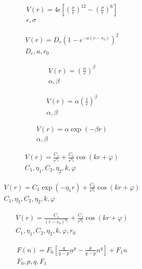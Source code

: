 \documentclass[a4paper,10pt]{article}
\begin{document}
\begin{eqnarray*}
V(r)=4\epsilon\left[\left(\frac{\sigma}{r}\right)^{12}-\left(\frac{\sigma}{r}\right)^{6}\right]\\
\epsilon,\sigma
\end{eqnarray*}

\begin{eqnarray*}
V(r)=D_e ( 1-e^{-a(r-r_0)} )^2 \\
D_e,a,r_0
\end{eqnarray*}

\begin{eqnarray*}
V(r)=\left(\frac{\alpha}{r}\right)^\beta \\
\alpha,\beta
\end{eqnarray*}

\begin{eqnarray*}
V(r)=\alpha\left(\frac{1}{r}\right)^\beta \\
\alpha,\beta
\end{eqnarray*}

\begin{eqnarray*}
V(r)=\alpha \exp\left(-\beta r\right) \\
\alpha,\beta
\end{eqnarray*}

\begin{eqnarray*}
V(r)=\frac{C_1}{r^{\eta_1}}+\frac{C_2}{r^{\eta_2}}\cos\left(kr+\varphi\right) \\
C_1,\eta_1,C_2,\eta_2,k,\varphi
\end{eqnarray*}

\begin{eqnarray*}
V(r)=C_1\exp\left(-\eta_1r\right)+\frac{C_2}{r^{\eta_2}}\cos\left(kr+\varphi\right) \\
C_1,\eta_1,C_2,\eta_2,k,\varphi
\end{eqnarray*}

\begin{eqnarray*}
V(r)=\frac{C_1}{\left(r-r_0\right)^{\eta_1}}+\frac{C_2}{r^{\eta_2}}\cos\left(kr+\varphi\right) \\
C_1,\eta_1,C_2,\eta_2,k,\varphi, r_0
\end{eqnarray*}

\begin{eqnarray*}
F(n)=F_0\left[\frac{q}{q-p}n^p-\frac{p}{q-p}n^q\right]+F_1n \\
F_0,p,q,F_1
\end{eqnarray*}
\end{document}
